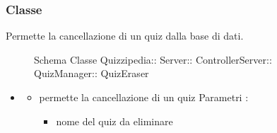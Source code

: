 \subsubsection{Classe }
Permette la cancellazione di un quiz dalla base di dati.
\begin{figure}[H]
\centering
\noindent{}
\caption[Schema Classe QuizEraser]{Schema Classe Quizzipedia:: Server:: ControllerServer:: QuizManager:: QuizEraser}
\end{figure}
\begin{itemize}
\item {}
\begin{itemize}
\item {}
\newline
permette la cancellazione di un quiz
\newline
Parametri :
\begin{itemize}
\item {}
\newline
nome del quiz da eliminare
\end{itemize}
\end{itemize}
\end{itemize}

